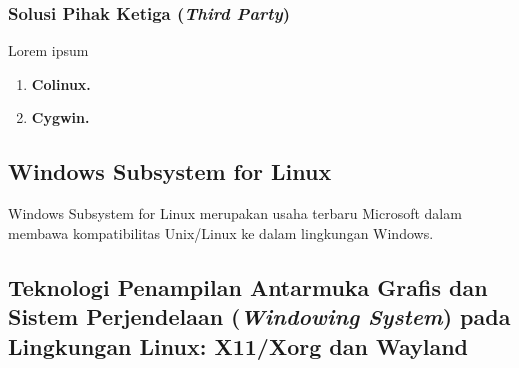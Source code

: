 




\subsubsection{Solusi Pihak Ketiga (\textit{Third Party})}

Lorem ipsum

\begin{enumerate}
    \item \textbf{Colinux.}

    \item \textbf{Cygwin.}
\end{enumerate}

\subsection{Windows Subsystem for Linux}

Windows Subsystem for Linux merupakan usaha terbaru Microsoft dalam membawa kompatibilitas Unix/Linux ke dalam lingkungan Windows.

\subsection{Teknologi Penampilan Antarmuka Grafis dan Sistem Perjendelaan (\textit{Windowing System}) pada Lingkungan Linux: X11/Xorg dan Wayland}

